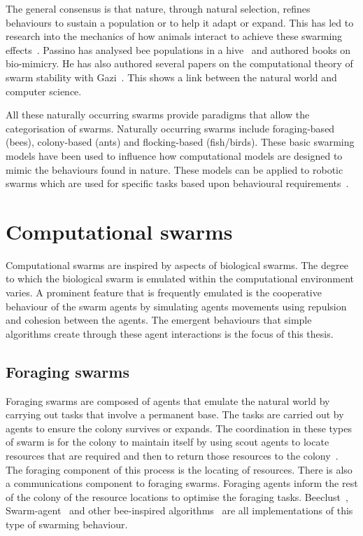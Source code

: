 The general consensus is that nature, through natural selection, refines behaviours to sustain a population or to help it adapt or expand. This has led to research into the mechanics of how animals interact to achieve these swarming effects~\cite{ENNT:10, RO:15, TDEB:12}. Passino has analysed bee populations in a hive~\cite{SVP:06} and authored books on bio-mimicry. He has also authored several papers on the computational theory of swarm stability with Gazi~\cite{GP:04, GP:02, GP:04a}. This shows a link between the natural world and computer science.

All these naturally occurring swarms provide paradigms that allow the categorisation of swarms. Naturally occurring swarms include foraging-based (bees), colony-based (ants) and flocking-based (fish/birds). These basic swarming models have been used to influence how computational models are designed to mimic the behaviours found in nature. These models can be applied to robotic swarms which are used for specific tasks based upon behavioural requirements~\cite{LG:14}.

\section{Computational swarms}
Computational swarms are inspired by aspects of biological swarms. The degree to which the biological swarm is emulated within the computational environment varies. A prominent feature that is frequently emulated is the cooperative behaviour of the swarm agents by simulating agents movements using repulsion and cohesion between the agents. The emergent behaviours that simple algorithms create through these agent interactions is the focus of this thesis.

\subsection{Foraging swarms}
Foraging swarms are composed of agents that emulate the natural world by carrying out tasks that involve a permanent base. The tasks are carried out by agents to ensure the colony survives or expands. The coordination in these types of swarm is for the colony to maintain itself by using scout agents to locate resources that are required and then to return those resources to the colony~\cite{GP:04a, HSWN:10, LWWA:07, LWWA:10}. The foraging component of this process is the locating of resources. There is also a communications component to foraging swarms. Foraging agents inform the rest of the colony of the resource locations to optimise the foraging tasks. Beeclust~\cite{PC:09, HER:11}, Swarm-agent~\cite{MFGAB:03} and other bee-inspired algorithms~\cite{LAA:13} are all implementations of this type of swarming behaviour.  

